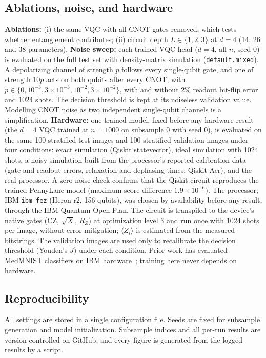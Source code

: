 \documentclass[conference]{IEEEtran}
\begin{document}
\subsection{Ablations, noise, and hardware}
\textbf{Ablations:} (i) the same VQC with all CNOT gates removed, which
tests whether entanglement contributes; (ii) circuit depth
$L\in\{1,2,3\}$ at $d=4$ (14, 26 and 38 parameters).
\textbf{Noise sweep:} each trained VQC head ($d=4$, all $n$, seed 0) is
evaluated on the full test set with density-matrix simulation
(\texttt{default.mixed}). A depolarizing channel of strength $p$ follows
every single-qubit gate, and one of strength $10p$ acts on both qubits
after every CNOT, with
$p\in\{0,10^{-3},3\times10^{-3},10^{-2},3\times10^{-2}\}$, with and
without 2\% readout bit-flip error and 1024 shots. The decision threshold
is kept at its noiseless validation value. Modelling CNOT noise as two
independent single-qubit channels is a simplification.
\textbf{Hardware:} one trained model, fixed before any hardware result
(the $d=4$ VQC trained at $n=1000$ on subsample 0 with seed 0), is
evaluated on the same 100 stratified test images and 100 stratified
validation images under four conditions: exact simulation (Qiskit
statevector), ideal simulation with 1024 shots, a noisy simulation built
from the processor's reported calibration data (gate and readout errors,
relaxation and dephasing times; Qiskit Aer), and the real processor. A
zero-noise check confirms that the Qiskit circuit reproduces the trained
PennyLane model (maximum score difference $1.9\times10^{-6}$). The
processor, IBM \texttt{ibm\_fez} (Heron r2, 156 qubits), was chosen by
availability before any result, through the IBM Quantum Open Plan. The
circuit is transpiled to the device's native gates (CZ, $\sqrt{X}$,
$R_Z$) at optimization level 3 and run once with 1024 shots per image,
without error mitigation; $\langle Z_i\rangle$ is estimated from the
measured bitstrings. The validation images are used only to recalibrate
the decision threshold (Youden's $J$) under each condition. Prior work
has evaluated MedMNIST classifiers on IBM hardware~\cite{singh2025};
training here never depends on hardware.

\subsection{Reproducibility}
All settings are stored in a single configuration file. Seeds are fixed
for subsample generation and model initialization. Subsample indices and
all per-run results are version-controlled on GitHub, and every figure is
generated from the logged results by a script.
\end{document}

